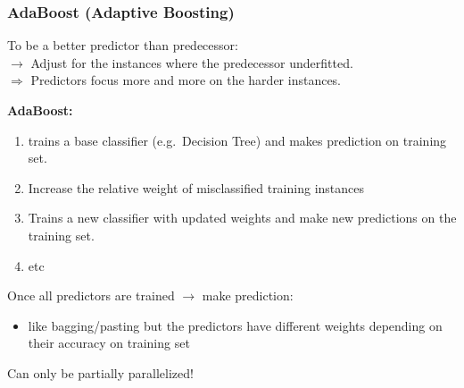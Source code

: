 \subsubsection{AdaBoost (Adaptive Boosting)}
To be a better predictor than predecessor:\\
$\rightarrow$ Adjust for the instances where the predecessor underfitted.\\
$\Rightarrow$ Predictors focus more and more on the harder instances.

\large{\textbf{AdaBoost:}}
\begin{enumerate}
    \item trains a base classifier (e.g.\ Decision Tree) and makes prediction on training set.
    \item Increase the relative weight of misclassified training instances
    \item Trains a new classifier with updated weights and make new predictions on the training set.
    \item etc
\end{enumerate}

Once all predictors are trained $\rightarrow$ make prediction:
\begin{itemize}
    \item like bagging/pasting but the predictors have different weights depending on their accuracy on training set
\end{itemize}

Can only be partially parallelized!

